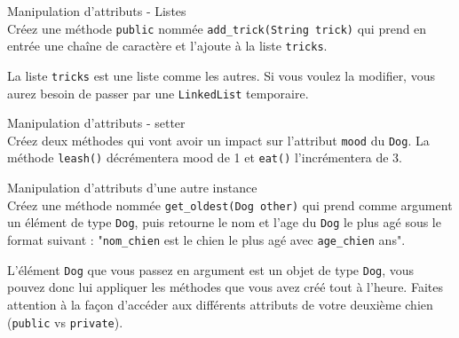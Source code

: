 \begin{Exercice}[5 minutes] Manipulation d'attributs - Listes\\
    Créez une méthode \lstinline{public} nommée \lstinline{add_trick(String trick)} qui prend en entrée une chaîne de caractère et l'ajoute à la liste \lstinline{tricks}. \\
   	
\begin{conseil}
   La liste \lstinline{tricks} est une liste comme les autres. Si vous voulez la modifier, vous aurez besoin de passer par une \lstinline{LinkedList} temporaire.
\end{conseil}
    
\begin{solution}
	
\end{solution}
\end{Exercice}

\begin{Exercice}[5 minutes] Manipulation d'attributs - setter\\
    Créez deux méthodes qui vont avoir un impact sur l'attribut \lstinline{mood} du \lstinline{Dog}. La méthode \lstinline{leash()} décrémentera mood de 1 et \lstinline{eat()} l'incrémentera de 3. \\

\begin{solution}
	
\end{solution}
\end{Exercice}

\begin{Exercice}[5 minutes] Manipulation d'attributs d'une autre instance\\
    Créez une méthode nommée \lstinline{get_oldest(Dog other)} qui prend comme argument un élément de type \lstinline{Dog}, puis retourne le nom et l'age du \lstinline{Dog} le plus agé sous le format suivant : "\lstinline{nom_chien} est le chien le plus agé avec \lstinline{age_chien} ans". \\
   	
\begin{conseil}
   L'élément \lstinline{Dog} que vous passez en argument est un objet de type \lstinline{Dog}, vous pouvez donc lui appliquer les méthodes que vous avez créé tout à l'heure.
   Faites attention à la façon d'accéder aux différents attributs de votre deuxième chien (\lstinline{public} vs \lstinline{private}).
\end{conseil}
    
\begin{solution}
	
\end{solution}
\end{Exercice}

